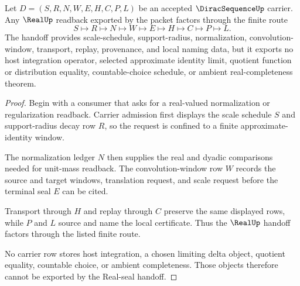 \begin{theorem}
\label{thm:dirac-sequence-real-seal-handoff}
Let $D=(S,R,N,W,E,H,C,P,L)$ be an accepted $\DiracSequenceUp$ carrier. Any $\RealUp$ readback exported by the packet factors through the finite route
$$
S \longmapsto R \longmapsto N \longmapsto W \longmapsto E \longmapsto H \longmapsto C \longmapsto P \longmapsto L .
$$
The handoff provides scale-schedule, support-radius, normalization, convolution-window, transport, replay, provenance, and local naming data, but it exports no host integration operator, selected approximate identity limit, quotient function or distribution equality, countable-choice schedule, or ambient real-completeness theorem.
\end{theorem}
\begin{proof}
Begin with a consumer that asks for a real-valued normalization or regularization readback. Carrier admission first displays the scale schedule $S$ and support-radius decay row $R$, so the request is confined to a finite approximate-identity window.

The normalization ledger $N$ then supplies the real and dyadic comparisons needed for unit-mass readback. The convolution-window row $W$ records the source and target windows, translation request, and scale request before the terminal seal $E$ can be cited.

Transport through $H$ and replay through $C$ preserve the same displayed rows, while $P$ and $L$ source and name the local certificate. Thus the $\RealUp$ handoff factors through the listed finite route.

No carrier row stores host integration, a chosen limiting delta object, quotient equality, countable choice, or ambient completeness. Those objects therefore cannot be exported by the Real-seal handoff.
\end{proof}


